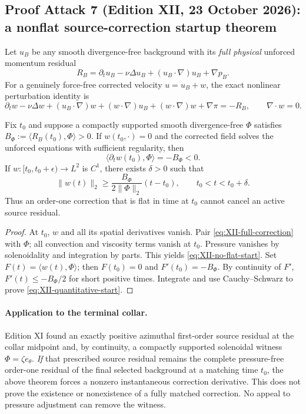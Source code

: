\subsection*{Proof Attack 7 (Edition XII, 23 October 2026): a nonflat source-correction startup theorem}
\label{subsec:n1-nonflat-start-XII}
Let $u_B$ be any smooth divergence-free background with its
\emph{full physical} unforced momentum residual
\[
R_B=\partial_tu_B-\nu\Delta u_B+
(u_B\cdot\nabla)u_B+\nabla p_B.
\]
For a genuinely force-free corrected velocity $u=u_B+w$,
the exact nonlinear perturbation identity is
\begin{equation}\label{eq:XII-full-correction}
\partial_tw-\nu\Delta w+(u_B\cdot\nabla)w+
(w\cdot\nabla)u_B+(w\cdot\nabla)w+\nabla\pi=-R_B,
\qquad \nabla\cdot w=0.
\end{equation}
\begin{theorem}
Fix $t_0$ and suppose a compactly supported smooth
divergence-free $\Phi$ satisfies
$B_\Phi:=\langle R_B(t_0),\Phi\rangle>0$.
If $w(t_0,\cdot)=0$ and the corrected field solves the
unforced equations with sufficient regularity, then
\begin{equation}\label{eq:XII-no-flat-start}
\boxed{\langle\partial_tw(t_0),\Phi\rangle=-B_\Phi<0.}
\end{equation}
If $w:[t_0,t_0+\epsilon)\to L^2$ is $C^1$,
there exists $\delta>0$ such that
\begin{equation}\label{eq:XII-quantitative-start}
\boxed{\|w(t)\|_2\ge\frac{B_\Phi}{2\|\Phi\|_2}(t-t_0),
\qquad t_0<t<t_0+\delta.}
\end{equation}
Thus an order-one correction that is flat in time at
$t_0$ cannot cancel an active source residual.
\end{theorem}
\begin{proof}
At $t_0$, $w$ and all its spatial derivatives vanish.
Pair \eqref{eq:XII-full-correction} with $\Phi$;
all convection and viscosity terms vanish at $t_0$.
Pressure vanishes by solenoidality and integration by parts.
This yields \eqref{eq:XII-no-flat-start}.
Set $F(t)=\langle w(t),\Phi\rangle$; then
$F(t_0)=0$ and $F'(t_0)=-B_\Phi$. By continuity of
$F'$, $F'(t)\le-B_\Phi/2$ for short positive times.
Integrate and use Cauchy--Schwarz to prove
\eqref{eq:XII-quantitative-start}.
\end{proof}
\paragraph{Application to the terminal collar.}
Edition XI found an exactly positive azimuthal first-order
source residual at the collar midpoint and, by continuity,
a compactly supported solenoidal witness $\Phi=\zeta e_\theta$.
\emph{If} that prescribed source residual remains the complete
pressure-free order-one residual of the final selected background
at a matching time $t_0$, the above theorem forces a nonzero
instantaneous correction derivative. This does not prove
the existence or nonexistence of a fully matched correction.
No appeal to pressure adjustment can remove the witness.

